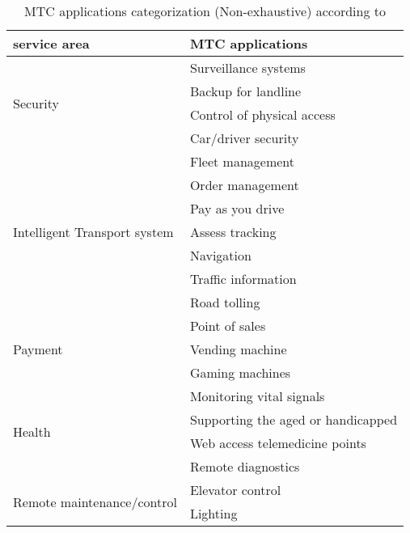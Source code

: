 \begin{center}
	\begin{longtable}{ll}
		\caption{MTC applications categorization (Non-exhaustive) according to \cite{3GPP/service-requirement}\cite{GhavimiF2015}\cite{mehmood2015mobile}} 
		\label{tab:MTC applications categorization}		\\
		\toprule
		service area                                                            & MTC applications                   \\ \midrule
		\multirow{4}{*}{Security}                                               & Surveillance systems               \\
		& Backup for landline                \\
		& Control of physical access         \\
		& Car/driver security                \\ \midrule
		\multirow{7}{*}{Intelligent Transport system}                                      & Fleet management                   \\
		& Order management                   \\
		& Pay as you drive                   \\
		& Assess tracking                    \\
		& Navigation                         \\
		& Traffic information                \\
		& Road tolling                       \\ \midrule
		\multirow{3}{*}{Payment}                                                & Point of sales                     \\
		& Vending machine                    \\
		& Gaming machines                    \\ \midrule
		\multirow{4}{*}{Health}                                                 & Monitoring vital signals           \\
		& Supporting the aged or handicapped \\
		& Web access telemedicine points     \\
		& Remote diagnostics                 \\ \midrule
		\multirow{5}{*}{Remote maintenance/control}                             & Elevator control                   \\
		& Lighting                           \\

\end{longtable}
\end{center}
